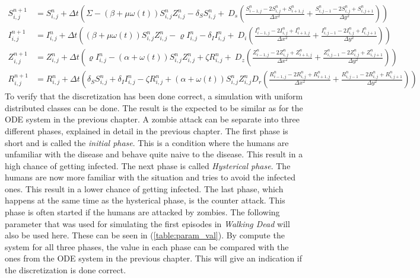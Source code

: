 \documentclass[%
twoside,                 %
final,                   %
10pt]{article}
\begin{document}
\begin{equation} \label{eq:SIZR_disc2}
	\begin{aligned}
    S^{n+1}_{i,j} &= S^n_{i,j} + \Delta t \left( \Sigma - (\beta+\mu \omega(t))S^{n}_{i,j}Z^{n}_{i,j}- \delta_S S^{n}_{i,j}+\
        D_s\left(\frac{S^{n}_{i-1,j}-2S^{n}_{i,j}+S^{n}_{i+1,j}}{\Delta x^2}+\frac{S^{n}_{i,j-1}-2S^{n}_{i,j}+S^{n}_{i,j+1}}{\Delta y^2}\right)\right) \\
    I^{n+1}_{i,j} &= I^n_{i,j} + \Delta t \left((\beta+\mu \omega(t))S^{n}_{i,j}Z^{n}_{i,j}-\varrho I^{n}_{i,j}- \delta_I I^{n}_{i,j}+\
        D_i\left(\frac{I^{n}_{i-1,j}-2I^{n}_{i,j}+I^{n}_{i+1,j}}{\Delta x^2}+\frac{I^{n}_{i,j-1}-2I^{n}_{i,j}+I^{n}_{i,j+1}}{\Delta y^2}\right)\right) \\
    Z^{n+1}_{i,j} &= Z^n_{i,j} +\Delta t \left( \varrho I^{n}_{i,j}-(\alpha+\omega(t))S^{n}_{i,j}Z^{n}_{i,j}+ \zeta R^{n}_{i,j}+\
        D_z\left(\frac{Z^{n}_{i-1,j}-2Z^{n}_{i,j}+Z^{n}_{i+1,j}}{\Delta x^2}+\frac{Z^{n}_{i,j-1}-2Z^{n}_{i,j}+Z^{n}_{i,j+1}}{\Delta y^2}\right)\right) \\
    R^{n+1}_{i,j} &= R^n_{i,j} +\Delta t \left(\delta_S S^{n}_{i,j}+\delta_I I^{n}_{i,j}-\zeta R^{n}_{i,j}+(\alpha+\omega(t))S^{n}_{i,j}Z^{n}_{i,j}
        D_r\left(\frac{R^{n}_{i-1,j}-2R^{n}_{i,j}+R^{n}_{i+1,j}}{\Delta x^2}+\frac{R^{n}_{i,j-1}-2R^{n}_{i,j}+R^{n}_{i,j+1}}{\Delta y^2}\right)\right) 
	\end{aligned}
\end{equation}
To verify that the discretization has been done correct, a simulation with uniform distributed classes can be done. The result is the expected to be similar as for the ODE system in the previous chapter. A zombie attack can be separate into three different phases, explained in detail in the previous chapter. The first phase is short and is called the \emph{initial phase}. This is a condition where the humans are unfamiliar with the disease and behave quite naive to the disease. This result in a high chance of getting infected. The next phase is called \emph{Hysterical phase}. The humans are now more familiar with the situation and tries to avoid the infected ones. This result in a lower chance of getting infected. The last phase, which happens at the same time as the hysterical phase, is the counter attack. This phase is often started if the humans are attacked by zombies. The following parameter that was used for simulating the first episodes in \emph{Walking Dead} will also be used here. These can be seen in (\ref{table:param_val}). By compute the system for all three phases, the value in each phase can be compared with the ones from the ODE system in the previous chapter. This will give an indication if the discretization is done correct. 
\end{document}
